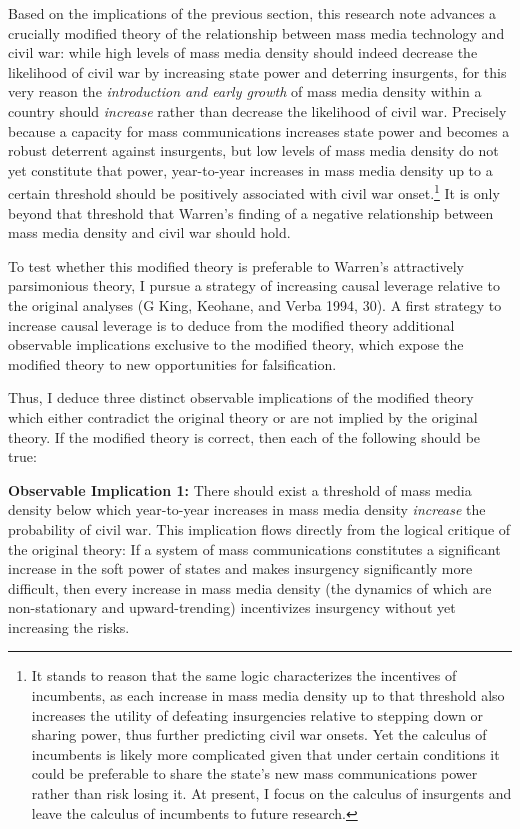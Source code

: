\documentclass[11pt,article,oneside]{memoir}
\begin{document}
Based on the implications of the previous section, this research note
advances a crucially modified theory of the relationship between mass
media technology and civil war: while high levels of mass media density
should indeed decrease the likelihood of civil war by increasing state
power and deterring insurgents, for this very reason the
\emph{introduction and early growth} of mass media density within a
country should \emph{increase} rather than decrease the likelihood of
civil war. Precisely because a capacity for mass communications
increases state power and becomes a robust deterrent against insurgents,
but low levels of mass media density do not yet constitute that power,
year-to-year increases in mass media density up to a certain threshold
should be positively associated with civil war onset.\footnote{It stands
  to reason that the same logic characterizes the incentives of
  incumbents, as each increase in mass media density up to that
  threshold also increases the utility of defeating insurgencies
  relative to stepping down or sharing power, thus further predicting
  civil war onsets. Yet the calculus of incumbents is likely more
  complicated given that under certain conditions it could be preferable
  to share the state's new mass communications power rather than risk
  losing it. At present, I focus on the calculus of insurgents and leave
  the calculus of incumbents to future research.} It is only beyond that
threshold that Warren's finding of a negative relationship between mass
media density and civil war should hold.

To test whether this modified theory is preferable to Warren's
attractively parsimonious theory, I pursue a strategy of increasing
causal leverage relative to the original analyses (G King, Keohane, and
Verba 1994, 30). A first strategy to increase causal leverage is to
deduce from the modified theory additional observable implications
exclusive to the modified theory, which expose the modified theory to
new opportunities for falsification.

Thus, I deduce three distinct observable implications of the modified
theory which either contradict the original theory or are not implied by
the original theory. If the modified theory is correct, then each of the
following should be true:

\textbf{Observable Implication 1:} There should exist a threshold of
mass media density below which year-to-year increases in mass media
density \emph{increase} the probability of civil war. This implication
flows directly from the logical critique of the original theory: If a
system of mass communications constitutes a significant increase in the
soft power of states and makes insurgency significantly more difficult,
then every increase in mass media density (the dynamics of which are
non-stationary and upward-trending) incentivizes insurgency without yet
increasing the risks.
\end{document}
